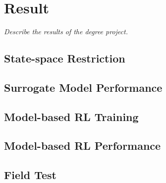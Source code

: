 \chapter{Result}
\label{chap5}
\textit{Describe the results of the degree project.}

\section{State-space Restriction}



\section{Surrogate Model Performance}


\section{Model-based RL Training}

\section{Model-based RL Performance}



\section{Field Test}
